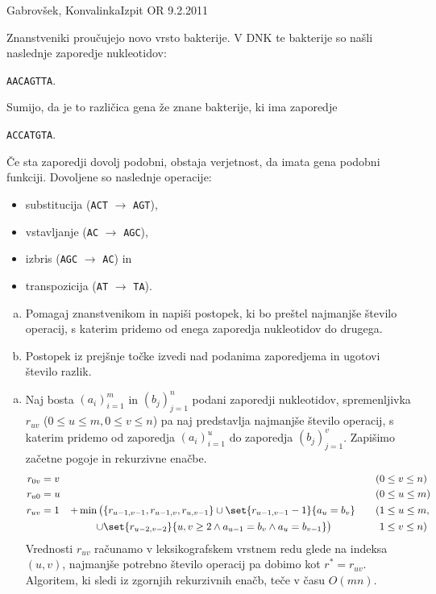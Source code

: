 \begin{naloga}{Gabrovšek, Konvalinka}{Izpit OR 9.2.2011}
\begin{vprasanje}
Znanstveniki proučujejo novo vrsto bakterije.
V DNK te bakterije so našli na\-sled\-nje zaporedje nukleotidov:
\begin{center}
{\tt AACAGTTA}.
\end{center}
Sumijo, da je to različica gena že znane bakterije, ki ima zaporedje
\begin{center}
{\tt ACCATGTA}.
\end{center}
Če sta zaporedji dovolj podobni,
obstaja verjetnost, da imata gena podobni funkciji.
Dovoljene so naslednje operacije:
\begin{itemize}
\item substitucija ({\tt ACT} $\to$ {\tt AGT}),
\item vstavljanje ({\tt AC} $\to$ {\tt AGC}),
\item izbris ({\tt AGC} $\to$ {\tt AC}) in
\item transpozicija ({\tt AT} $\to$ {\tt TA}).
\end{itemize}
\begin{enumerate}[(a)]
\item Pomagaj znanstvenikom in napiši postopek,
ki bo preštel najmanjše število operacij,
s katerim pridemo od enega zaporedja nukleotidov do drugega.
\item Postopek iz prejšnje točke izvedi nad podanima zaporedjema
in ugotovi število razlik.
\end{enumerate}
\end{vprasanje}

\begin{odgovor}
\begin{enumerate}[(a)]
\item Naj bosta $(a_i)_{i=1}^m$ in $(b_j)_{j=1}^n$
podani zaporedji nukleotidov,
spremenljivka $r_{uv}$ ($0 \le u \le m, 0 \le v \le n$)
pa naj predstavlja najmanjše število operacij,
s katerim pridemo od zaporedja $(a_i)_{i=1}^u$
do zaporedja $(b_j)_{j=1}^v$.
Zapišimo začetne pogoje in rekurzivne enačbe.
\begin{alignat*}{3}
r_{0v} &= v &&&\quad (0 &\le v \le n) \\
r_{u0} &= u &&&\quad (0 &\le u \le m) \\
r_{uv} &= 1 &+ \min\big(
&{} \{r_{u-1,v-1}, r_{u-1,v}, r_{u,v-1}\} \cup \set{r_{u-1,v-1} - 1}{a_u = b_v}
&\quad (1 &\le u \le m, \\
&& \cup &{} \set{r_{u-2,v-2}}{u, v \ge 2
                              \land a_{u-1} = b_v \land a_u = b_{v-1}}\big)
&\quad 1 &\le v \le n)
\end{alignat*}
Vrednosti $r_{uv}$ računamo v leksikografskem vrstnem redu
glede na indeksa $(u, v)$,
najmanjše potrebno število operacij pa dobimo kot $r^* = r_{uv}$.
Algoritem, ki sledi iz zgornjih rekurzivnih enačb, teče v času $O(mn)$.


\end{enumerate}
\end{odgovor}
\end{naloga}
